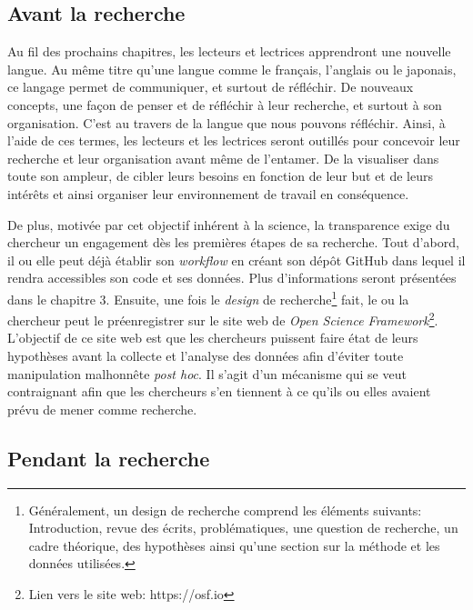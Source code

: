 \documentclass[
  letterpaper,
  DIV=11,
  numbers=noendperiod]{scrreprt}
\begin{document}
\subsection{Avant la recherche}\label{avant-la-recherche}

Au fil des prochains chapitres, les lecteurs et lectrices apprendront
une nouvelle langue. Au même titre qu'une langue comme le français,
l'anglais ou le japonais, ce langage permet de communiquer, et surtout
de réfléchir. De nouveaux concepts, une façon de penser et de réfléchir
à leur recherche, et surtout à son organisation. C'est au travers de la
langue que nous pouvons réfléchir. Ainsi, à l'aide de ces termes, les
lecteurs et les lectrices seront outillés pour concevoir leur recherche
et leur organisation avant même de l'entamer. De la visualiser dans
toute son ampleur, de cibler leurs besoins en fonction de leur but et de
leurs intérêts et ainsi organiser leur environnement de travail en
conséquence.

De plus, motivée par cet objectif inhérent à la science, la transparence
exige du chercheur un engagement dès les premières étapes de sa
recherche. Tout d'abord, il ou elle peut déjà établir son
\emph{workflow} en créant son dépôt GitHub dans lequel il rendra
accessibles son code et ses données. Plus d'informations seront
présentées dans le chapitre 3. Ensuite, une fois le \emph{design} de
recherche\footnote{Généralement, un design de recherche comprend les
  éléments suivants: Introduction, revue des écrits, problématiques, une
  question de recherche, un cadre théorique, des hypothèses ainsi qu'une
  section sur la méthode et les données utilisées.} fait, le ou la
chercheur peut le préenregistrer sur le site web de \emph{Open Science
Framework}\footnote{Lien vers le site web: https://osf.io}. L'objectif
de ce site web est que les chercheurs puissent faire état de leurs
hypothèses avant la collecte et l'analyse des données afin d'éviter
toute manipulation malhonnête \emph{post hoc}. Il s'agit d'un mécanisme
qui se veut contraignant afin que les chercheurs s'en tiennent à ce
qu'ils ou elles avaient prévu de mener comme recherche.

\subsection{Pendant la recherche}\label{pendant-la-recherche}
\end{document}
